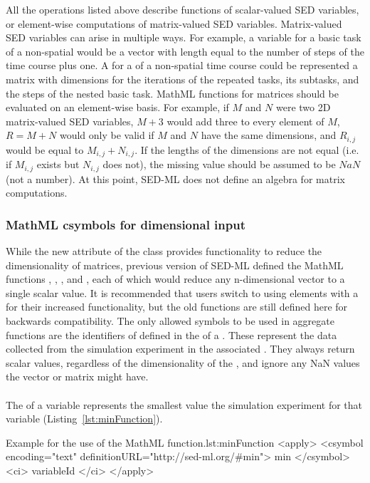 All the operations listed above describe functions of scalar-valued SED variables, or element-wise computations of matrix-valued SED variables. Matrix-valued SED variables can arise in multiple ways. For example, a variable for a basic task of a non-spatial \UniformTimeCourse would be a vector with length equal to the number of steps of the time course plus one. A \Variable for a \RepeatedTask of a non-spatial time course could be represented a matrix with dimensions for the iterations of the repeated tasks, its subtasks, and the steps of the nested basic task. MathML functions for matrices should be evaluated on an element-wise basis. For example, if $M$ and $N$ were two 2D matrix-valued SED variables, $M+3$ would add three to every element of $M$, $R = M+N$ would only be valid if $M$ and $N$ have the same dimensions, and $R_{i,j}$ would be equal to $M_{i,j} + N_{i,j}$. If the lengths of the dimensions are not equal (i.e. if $M_{i,j}$ exists but $N_{i,j}$ does not), the missing value should be assumed to be $NaN$ (not a number).  At this point, SED-ML does not define an algebra for matrix computations.

\subsubsection{MathML csymbols for dimensional input}

While the new  attribute of the \Variable class provides functionality to reduce the dimensionality of matrices, previous version of SED-ML defined the MathML functions \sedmin, \sedmax, \sedsum, and \product, each of which would reduce any n-dimensional vector to a single scalar value.  It is recommended that users switch to using \Variable elements with a  for their increased functionality, but the old functions are still defined here for backwards compatibility.  The only allowed symbols to be used in aggregate functions are the identifiers of \Variables defined in the \hyperref[class:listOfVariables]{} of a \DataGenerator. These \Variables represent the data collected from the simulation experiment in the associated \Task.  They always return scalar values, regardless of the dimensionality of the \Variable, and ignore any NaN values the vector or matrix might have.

\paragraph*{}
\label{fun:min}
The  of a variable represents the smallest value the simulation experiment for that variable (Listing~\ref{lst:minFunction}). 
\begin{myXmlLst}{Example for the use of the MathML  function.}{lst:minFunction}
<apply>
 	<csymbol encoding="text" definitionURL="http://sed-ml.org/#min">
 		min
 	</csymbol>
 	<ci> variableId </ci>
</apply>
\end{myXmlLst}

